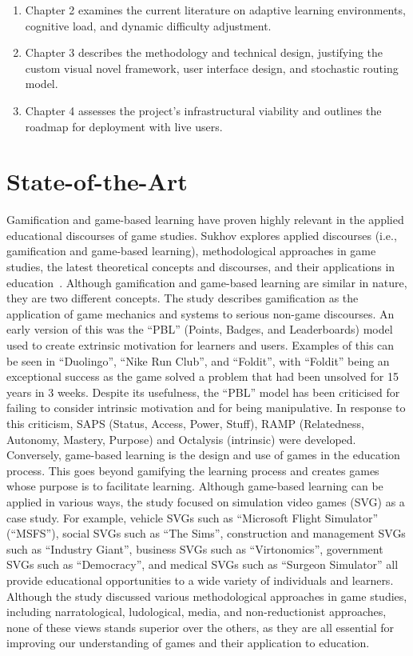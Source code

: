 \documentclass[12pt,a4paper]{report}
\begin{document}
\begin{enumerate}
    \item Chapter 2 examines the current literature on adaptive learning environments, cognitive load, and dynamic difficulty adjustment.

    \item Chapter 3 describes the methodology and technical design, justifying the custom visual novel framework, user interface design, and stochastic routing model.

    \item Chapter 4 assesses the project's infrastructural viability and outlines the roadmap for deployment with live users.
\end{enumerate}



\chapter{State-of-the-Art}

\quad Gamification and game-based learning have proven highly relevant in the applied educational discourses of game studies. Sukhov explores applied discourses (i.e., gamification and game-based learning), methodological approaches in game studies, the latest theoretical concepts and discourses, and their applications in education~\cite{1}. Although gamification and game-based learning are similar in nature, they are two different concepts.  The study describes gamification as the application of game mechanics and systems to serious non-game discourses. An early version of this was the “PBL” (Points, Badges, and Leaderboards) model used to create extrinsic motivation for learners and users. Examples of this can be seen in “Duolingo”, “Nike Run Club”, and “Foldit”, with “Foldit” being an exceptional success as the game solved a problem that had been unsolved for 15 years in 3 weeks. Despite its usefulness, the “PBL” model has been criticised for failing to consider intrinsic motivation and for being manipulative. In response to this criticism, SAPS (Status, Access, Power, Stuff), RAMP (Relatedness, Autonomy, Mastery, Purpose) and Octalysis (intrinsic) were developed. Conversely, game-based learning is the design and use of games in the education process. This goes beyond gamifying the learning process and creates games whose purpose is to facilitate learning. Although game-based learning can be applied in various ways, the study focused on simulation video games (SVG) as a case study. For example, vehicle SVGs such as “Microsoft Flight Simulator” (“MSFS”), social SVGs such as “The Sims”, construction and management SVGs such as “Industry Giant”, business SVGs such as “Virtonomics”, government SVGs such as “Democracy”, and medical SVGs such as “Surgeon Simulator” all provide educational opportunities to a wide variety of individuals and learners. Although the study discussed various methodological approaches in game studies, including narratological, ludological, media, and non-reductionist approaches, none of these views stands superior over the others, as they are all essential for improving our understanding of games and their application to education.
\end{document}
